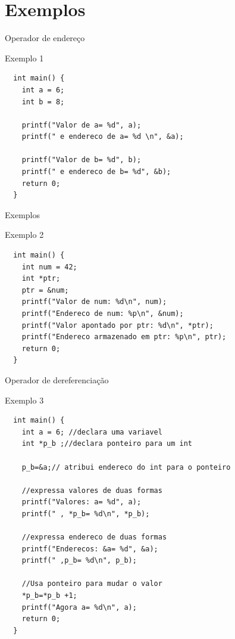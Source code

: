 \section{Exemplos}



\begin{frame}[fragile]{Operador de endereço}
\begin{block}{Exemplo 1}
\begin{lstlisting}
  int main() {
    int a = 6;
    int b = 8;
    
    printf("Valor de a= %d", a);
    printf(" e endereco de a= %d \n", &a);
    
    printf("Valor de b= %d", b);
    printf(" e endereco de b= %d", &b);
    return 0;
  }
\end{lstlisting}
\end{block}
\end{frame}


\begin{frame}[fragile]{Exemplos}
\begin{block}{Exemplo 2}
\begin{lstlisting}
  int main() {
    int num = 42;
    int *ptr;
    ptr = &num;
    printf("Valor de num: %d\n", num);
    printf("Endereco de num: %p\n", &num);
    printf("Valor apontado por ptr: %d\n", *ptr);
    printf("Endereco armazenado em ptr: %p\n", ptr);
    return 0;
  }
\end{lstlisting}
\end{block}
\end{frame}




\begin{frame}[fragile]{Operador de dereferenciação}
\begin{block}{Exemplo 3}
\begin{lstlisting}
  int main() {
    int a = 6; //declara uma variavel
    int *p_b ;//declara ponteiro para um int
    
    p_b=&a;// atribui endereco do int para o ponteiro
    
    //expressa valores de duas formas
    printf("Valores: a= %d", a);
    printf(" , *p_b= %d\n", *p_b);
    
    //expressa endereco de duas formas
    printf("Enderecos: &a= %d", &a);
    printf(" ,p_b= %d\n", p_b);
    
	//Usa ponteiro para mudar o valor
	*p_b=*p_b +1;
	printf("Agora a= %d\n", a);
    return 0;
  }
\end{lstlisting}
\end{block}
\end{frame}


